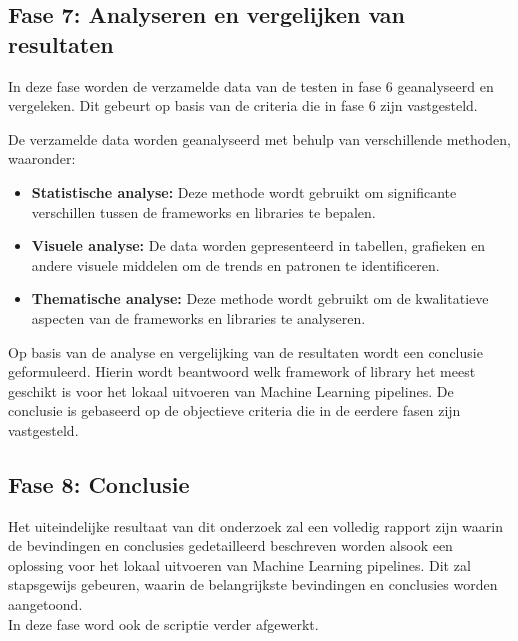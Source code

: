 \subsection{Fase 7: Analyseren en vergelijken van resultaten}
In deze fase worden de verzamelde data van de testen in fase 6 geanalyseerd en vergeleken. Dit gebeurt op basis van de criteria die in fase 6 zijn vastgesteld.

De verzamelde data worden geanalyseerd met behulp van verschillende methoden, waaronder:
\begin{itemize}
  \item \textbf{Statistische analyse:} Deze methode wordt gebruikt om significante verschillen tussen de frameworks en libraries te bepalen.
  \item \textbf{Visuele analyse:} De data worden gepresenteerd in tabellen, grafieken en andere visuele middelen om de trends en patronen te identificeren.
  \item \textbf{Thematische analyse:}  Deze methode wordt gebruikt om de kwalitatieve aspecten van de frameworks en libraries te analyseren.
\end{itemize}

Op basis van de analyse en vergelijking van de resultaten wordt een conclusie geformuleerd. Hierin wordt beantwoord welk framework of library het meest geschikt is voor het lokaal uitvoeren van Machine Learning pipelines. De conclusie is gebaseerd op de objectieve criteria die in de eerdere fasen zijn vastgesteld.
\subsection{Fase 8: Conclusie}
Het uiteindelijke resultaat van dit onderzoek zal een volledig rapport zijn waarin de bevindingen en conclusies gedetailleerd beschreven worden alsook een oplossing voor het lokaal uitvoeren van Machine Learning pipelines. Dit zal stapsgewijs gebeuren, waarin de belangrijkste bevindingen en conclusies worden aangetoond.\\
In deze fase word ook de scriptie verder afgewerkt.

